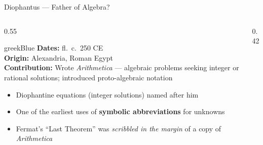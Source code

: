\begin{frame}[shrink=4]{Diophantus --- Father of Algebra?}

  \begin{columns}[T]
    \begin{column}{0.55\textwidth}
      \begin{personbox}{greekBlue}
        \small
        \textbf{Dates:} fl.\ c.\ 250 CE\\
        \textbf{Origin:} Alexandria, Roman Egypt\\
        \textbf{Contribution:} Wrote \emph{Arithmetica} --- algebraic problems seeking
        integer or rational solutions; introduced proto-algebraic notation
      \end{personbox}

      \vspace{0.3em}
      \begin{itemize}
        \item \alert{Diophantine equations} (integer solutions) named after him
        \item One of the earliest uses of \textbf{symbolic abbreviations} for unknowns
        \item Fermat's ``Last Theorem'' was \emph{scribbled in the margin} of a copy of \emph{Arithmetica}
      \end{itemize}
    \end{column}

    \begin{column}{0.42\textwidth}

      \vspace{0.3em}
    \end{column}
  \end{columns}

\end{frame}

